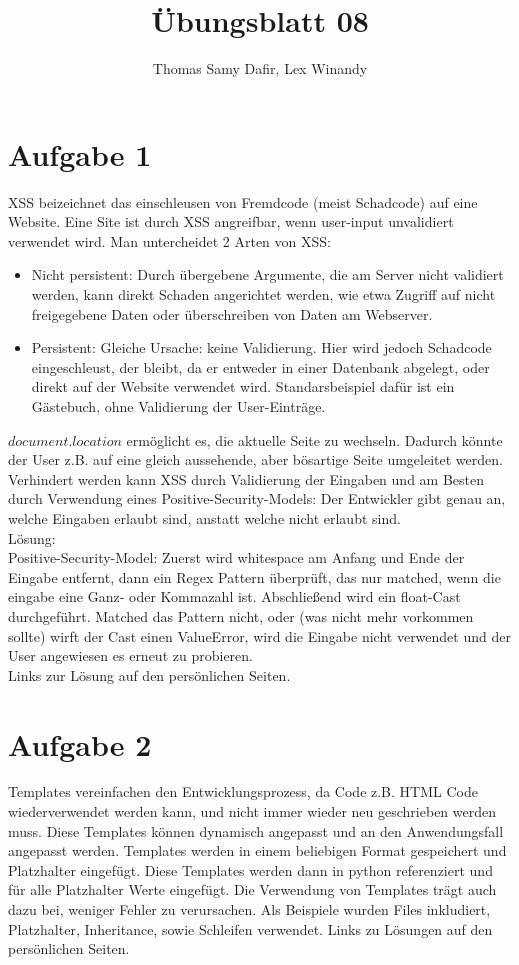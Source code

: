\documentclass[12pt, a4paper]{report}
\title{Übungsblatt 08}
\author{Thomas Samy Dafir, Lex Winandy}
\date{}
\begin{document}
\maketitle

\section*{Aufgabe 1}
XSS beizeichnet das einschleusen von Fremdcode (meist Schadcode) auf eine Website. Eine Site ist durch XSS angreifbar, wenn user-input unvalidiert verwendet wird. Man untercheidet 2 Arten von XSS:
\begin{itemize}
	\item Nicht persistent: Durch übergebene Argumente, die am Server nicht validiert werden, kann direkt Schaden angerichtet werden, wie etwa Zugriff auf nicht freigegebene Daten oder überschreiben von Daten am Webserver.
	\item Persistent: Gleiche Ursache: keine Validierung. Hier wird jedoch Schadcode eingeschleust, der bleibt, da er entweder in einer Datenbank abgelegt, oder direkt auf der Website verwendet wird. Standarsbeispiel dafür ist ein Gästebuch, ohne Validierung der User-Einträge.
\end{itemize}
$document.location$ ermöglicht es, die aktuelle Seite zu wechseln. Dadurch könnte der User z.B. auf eine gleich aussehende, aber bösartige Seite umgeleitet werden.
Verhindert werden kann XSS durch Validierung der Eingaben und am Besten durch Verwendung eines Positive-Security-Models: Der Entwickler gibt genau an, welche Eingaben erlaubt sind, anstatt welche nicht erlaubt sind.\\
Lösung:\\
Positive-Security-Model: Zuerst wird whitespace am Anfang und Ende der Eingabe entfernt, dann ein Regex Pattern überprüft, das nur matched, wenn die eingabe eine Ganz- oder Kommazahl ist. Abschließend wird ein float-Cast durchgeführt. Matched das Pattern nicht, oder (was nicht mehr vorkommen sollte) wirft der Cast einen ValueError, wird die Eingabe nicht verwendet und der User angewiesen es erneut zu probieren.\\
Links zur Lösung auf den persönlichen Seiten.


\section*{Aufgabe 2}
Templates vereinfachen den Entwicklungsprozess, da Code z.B. HTML Code wiederverwendet werden kann, und nicht immer wieder neu geschrieben werden muss. Diese Templates können dynamisch angepasst und an den Anwendungsfall angepasst werden. Templates werden in einem beliebigen Format gespeichert und Platzhalter eingefügt. Diese Templates werden dann in python referenziert und für alle Platzhalter Werte eingefügt. Die Verwendung von Templates trägt auch dazu bei, weniger Fehler zu verursachen.
Als Beispiele wurden Files inkludiert, Platzhalter, Inheritance, sowie Schleifen verwendet.
Links zu Lösungen auf den persönlichen Seiten.
\end{document}
